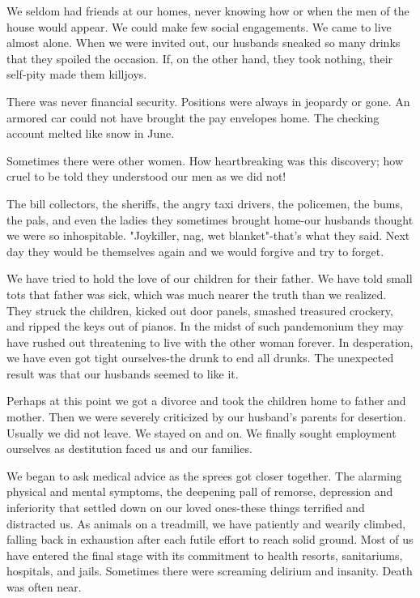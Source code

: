 \begin{biblechapter}
We seldom had friends at our homes, never knowing how or when the men of the house would appear.  We could make few social engagements.  We came to live almost alone.  When we were invited out, our husbands sneaked so many drinks that they spoiled the occasion.  If, on the other hand, they took nothing, their self-pity made them killjoys.

There was never financial security.  Positions were always in jeopardy or gone.  An armored car could  not have brought the pay envelopes home.  The checking account melted like snow in June.

Sometimes there were other women.  How heartbreaking was this discovery; how cruel to be told they understood our men as we did not!

The bill collectors, the sheriffs, the angry taxi drivers, the policemen, the bums, the pals, and even the ladies they sometimes brought home-our husbands thought we were so inhospitable.  "Joykiller, nag, wet blanket"-that's what they said.  Next day they would be themselves again and we would forgive and try to forget.

We have tried to hold the love of our children for their father.  We have told small tots that father was sick, which was much nearer the truth than we realized.  They struck the children, kicked out door panels, smashed treasured crockery, and ripped the keys out of pianos.  In the midst of such pandemonium they may have rushed out threatening to live with the other woman forever.  In desperation, we have even got tight ourselves-the drunk to end all drunks.  The unexpected result was that our husbands seemed to like it.

Perhaps at this point we got a divorce and took the children home to father and mother.  Then we were severely criticized by our husband's parents for desertion.  Usually we did not leave.  We stayed on and on.  We finally sought employment ourselves as destitution faced us and our families.

We began to ask medical advice as the sprees got closer together.  The alarming physical and mental symptoms, the deepening pall of remorse, depression and inferiority that settled down on our loved ones-these things terrified and distracted us.  As animals on a treadmill, we have patiently and wearily climbed, falling back in exhaustion after each futile effort to reach solid ground.  Most of us have entered the final stage with its commitment to health resorts, sanitariums, hospitals, and jails.  Sometimes there were screaming delirium and insanity.  Death was often near.


\end{biblechapter}
